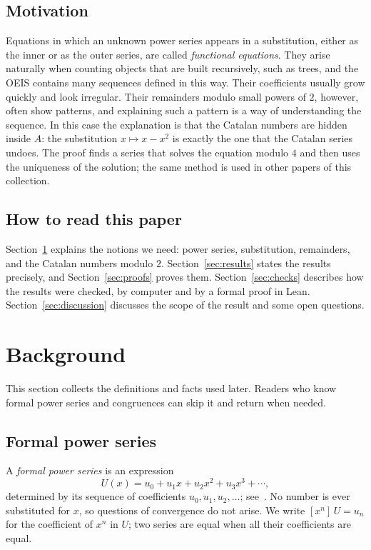 \documentclass[11pt,a4paper]{article}
\theoremstyle{definition}
\theoremstyle{remark}
\newcommand{\coeff}[2]{[x^{#1}]\,#2}
\begin{document}
\subsection{Motivation}
Equations in which an unknown power series appears in a substitution, either as the inner or as the outer series,
are called \emph{functional equations}. They arise naturally when counting objects that are built recursively, such as trees,
and the OEIS contains many sequences defined in this way. Their coefficients usually grow quickly and look irregular.
Their remainders modulo small powers of $2$, however, often show patterns, and explaining such a pattern is a
way of understanding the sequence. In this case the explanation is that the Catalan numbers are hidden inside $A$: the
substitution $x\mapsto x-x^2$ is exactly the one that the Catalan series undoes. The proof finds a series that solves the
equation modulo $4$ and then uses the uniqueness of the solution; the same method is used in other papers of this
collection.

\subsection{How to read this paper}
Section~\ref{sec:background} explains the notions we need: power series, substitution, remainders, and the
Catalan numbers modulo $2$. Section~\ref{sec:results} states the results precisely, and Section~\ref{sec:proofs} proves
them. Section~\ref{sec:checks} describes how the results were checked, by computer and by a formal proof in Lean.
Section~\ref{sec:discussion} discusses the scope of the result and some open questions.
\section{Background}\label{sec:background}
This section collects the definitions and facts used later. Readers who know formal power series and congruences can skip it and return when needed.
\subsection{Formal power series}
A \emph{formal power series} is an expression
\[
U(x)=u_0+u_1x+u_2x^2+u_3x^3+\cdots ,
\]
determined by its sequence of coefficients $u_0,u_1,u_2,\dots$; see~\cite{niven,stanley}. No number is ever
substituted for $x$, so questions of convergence do not arise. We write $\coeff{n}{U}=u_n$ for the coefficient of $x^n$ in $U$; two series are equal
when all their coefficients are equal.
\end{document}
